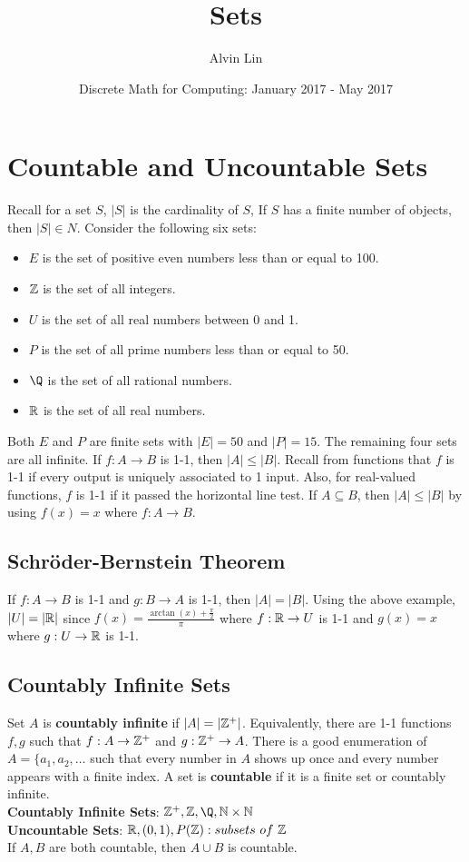 \documentclass[letterpaper, 12pt]{math}
\title{Sets}
\author{Alvin Lin}
\date{Discrete Math for Computing: January 2017 - May 2017}
\begin{document}
\maketitle

\section*{Countable and Uncountable Sets}
Recall for a set \( S \), \( |S| \) is the cardinality of \( S \), If \( S \)
has a finite number of objects, then \( |S|\in N \). Consider the following
six sets:
\begin{itemize}
  \item \( E \) is the set of positive even numbers less than or equal
    to 100.
  \item \( \mathbb{Z} \) is the set of all integers.
  \item \( U \) is the set of all real numbers between 0 and 1.
  \item \( P \) is the set of all prime numbers less than or equal to
    50.
  \item \( \Q \) is the set of all rational numbers.
  \item \( \mathbb{R} \) is the set of all real numbers.
\end{itemize}
Both \( E \) and \( P \) are finite sets with \( |E| = 50 \) and \( |P| = 15 \).
The remaining four sets are all infinite. If \( f:A\to B \) is 1-1, then
\( |A|\leq|B| \). Recall from functions that \( f \) is 1-1 if every output
is uniquely associated to 1 input. Also, for real-valued functions, \( f \)
is 1-1 if it passed the horizontal line test. If \( A\subseteq B \), then
\( |A|\leq|B| \) by using \( f(x) = x \) where \( f:A\to B \).

\subsection*{Schr{\"o}der-Bernstein Theorem}
If \( f:A\to B \) is 1-1 and \( g:B\to A \) is 1-1, then \( |A| = |B| \).
Using the above example, \( |U| = |\mathbb{R}| \) since \( f(x) =
\frac{\arctan(x)+\frac{\pi}{2}}{\pi} \) where \( f:\mathbb{R}\to U \) is 1-1 and
\( g(x) = x \) where \( g:U\to\mathbb{R} \) is 1-1.

\subsection*{Countably Infinite Sets}
Set \( A \) is \textbf{countably infinite} if \( |A| = |\mathbb{Z}^{+}| \).
Equivalently, there are 1-1 functions \( f,g \) such that \( f:A\to\mathbb{Z}^{+} \) and
\( g:\mathbb{Z}^{+}\to A \). There is a good enumeration of \( A =
\{a_{1},a_{2},\dots\) such that every number in \( A \) shows up once and every
number appears with a finite index. A set is \textbf{countable} if it is a
finite set or countably infinite. \\
\textbf{Countably Infinite Sets}: \( \Z^{+}, \Z, \Q , \N\times\N \) \\
\textbf{Uncountable Sets}: \( \mathbb{R}, (0,1), P(\mathbb{Z}): subsets\ of\ \mathbb{Z} \) \\
If \( A,B \) are both countable, then \( A\cup B \) is countable.
\end{document}
